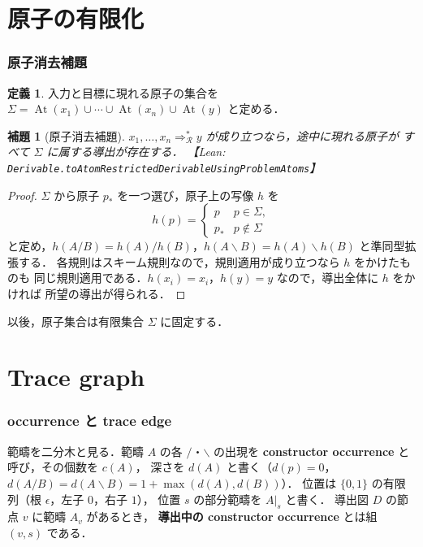 \documentclass[paper=a4,fontsize=10pt,jafontscale=0.92]{jlreq}
\theoremstyle{plain}
\newtheorem{lemma}[theorem]{補題}
\theoremstyle{definition}
\newtheorem{definition}[theorem]{定義}
\theoremstyle{remark}
\newcommand{\R}{\mathcal{R}}
\newcommand{\Sig}{\Sigma}
\newcommand{\At}{\operatorname{At}}
\newcommand{\bs}{\backslash}
\newcommand{\lean}[1]{\texttt{#1}}
\begin{document}
\part{原子の有限化}

\section{原子消去補題}
\label{sec:atom}

\begin{definition}
入力と目標に現れる原子の集合を
$\Sig = \At(x_1) \cup \cdots \cup \At(x_n) \cup \At(y)$
と定める．
\end{definition}

\begin{lemma}[原子消去補題]
\label{lem:atom}
$x_1, \ldots, x_n \Rightarrow_{\R}^{*} y$ が成り立つなら，途中に現れる原子が
すべて $\Sig$ に属する導出が存在する．
【Lean: \lean{Derivable.toAtomRestrictedDerivableUsingProblemAtoms}】
\end{lemma}

\begin{proof}
$\Sig$ から原子 $p_\ast$ を一つ選び，原子上の写像 $h$ を
\[
  h(p) = \begin{cases} p & p \in \Sig,\\ p_\ast & p \notin \Sig \end{cases}
\]
と定め，$h(A/B) = h(A)/h(B)$，$h(A\bs B) = h(A)\bs h(B)$ と準同型拡張する．
各規則はスキーム規則なので，規則適用が成り立つなら $h$ をかけたものも
同じ規則適用である．$h(x_i)=x_i$，$h(y)=y$ なので，導出全体に $h$ をかければ
所望の導出が得られる．
\end{proof}

以後，原子集合は有限集合 $\Sig$ に固定する．

\part{Trace graph}

\section{occurrence と trace edge}
\label{sec:trace}

範疇を二分木と見る．範疇 $A$ の各 $/$・$\bs$ の出現を
\textbf{constructor occurrence} と呼び，その個数を $c(A)$，
深さを $d(A)$ と書く（$d(p)=0$，$d(A/B)=d(A\bs B)=1+\max(d(A),d(B))$）．
位置は $\{0,1\}$ の有限列（根 $\epsilon$，左子 $0$，右子 $1$），
位置 $s$ の部分範疇を $A|_s$ と書く．
導出図 $D$ の節点 $v$ に範疇 $A_v$ があるとき，
\textbf{導出中の constructor occurrence} とは組 $(v,s)$ である．
\end{document}
